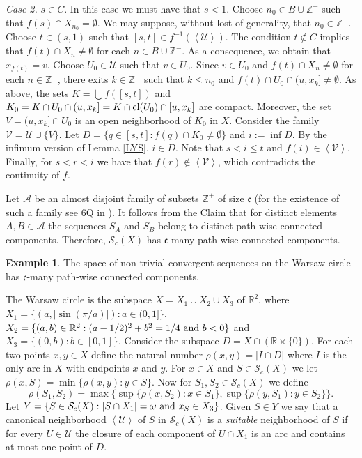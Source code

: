 \documentclass[11pt]{amsart}
\numberwithin{equation}{section}
\theoremstyle{plain}
\theoremstyle{definition}
\theoremstyle{definition}
\theoremstyle{definition}
\theoremstyle{definition}
\newtheorem{example}[equation]{Example}
\theoremstyle{definition}
\begin{document}
\textit{Case 2.} $s \in C$. In this case we must have that $s < 1$. Choose $n_0 \in B \cup {\mathbb{Z}^-}$ such that $f(s) \cap X_{n_0} = \emptyset$.  We may suppose, without lost of generality, that $n_0 \in {\mathbb{Z}^-}$. Choose $t \in (s,1)$ such that $[s,t] \in f^{-1}(\left\langle \mathcal{U}\right\rangle)$. The condition $t \not\in C$ implies that $f(t) \cap X_n \not= \emptyset$ for each $n \in B \cup {\mathbb{Z}^-}$. As a consequence, we obtain that $x_{f(t)} = v$. Choose $U_0 \in \mathcal{U}$ such that $v \in U_0$. Since $v \in U_0$ and $f(t) \cap X_n \not= \emptyset$ for each $n \in {\mathbb{Z}^-}$,  there exits $k \in {\mathbb{Z}^-}$ such that $k \leq n_0$ and $f(t) \cap U_0 \cap (u,x_k] \not= \emptyset$. As above,  the sets $K = \bigcup f([s,t])$ and $K_0 = K \cap U_0 \cap (u,x_k] = K \cap \textnormal{cl}(U_0) \cap [u,x_k]$ are compact. Moreover, the set $V = (u,x_k] \cap U_0$ is an open neighborhood of $K_0$ in $X$. Consider the family $\mathcal{V} = \mathcal{U} \cup \{V\}$. Let $D = \{q \in [s,t] : f(q) \cap K_0 \not= \emptyset\}$ and $i := \inf D$. By the infimum version of Lemma \ref{LYS}, $i \in D$. Note that $s < i \leq t$ and $f(i) \in \left\langle \mathcal{V} \right\rangle$. Finally, for $s < r < i$ we have that $f(r) \not \in \left\langle \mathcal{V} \right\rangle$, which contradicts the continuity of $f$.\medskip

Let $\mathcal{A}$ be an almost disjoint family of subsets ${\mathbb{Z}^+}$ of size $\mathfrak{c}$ (for the existence of such a family see 6Q in \cite{gaj}). It follows from the Claim that for  distinct elements $A,B \in \mathcal{A}$ the sequences $S_A$ and $S_B$ belong to distinct path-wise connected components. Therefore,   $\mathcal{S}_c(X)$ has $\mathfrak{c}$-many path-wise connected components.
\endproof

\begin{example}
The space of non-trivial convergent sequences on the Warsaw circle has $\mathfrak{c}$-many path-wise connected components.
\end{example}

\proof
The Warsaw circle is the subspace $X = X_1 \cup X_2 \cup X_3$ of ${\mathbb R}^2$, where $X_1 = \{(a,\left|\sin(\pi/a)\right|) : a \in (0,1]\}$, $X_2 = \{(a,b) \in {\mathbb R}^2 : (a-1/2)^2 + b^2 = 1/4 \textnormal{ and } b < 0\}$ and $X_3 = \{(0,b) : b \in [0,1]\}$. Consider the subspace $D = X \cap ({\mathbb R} \times \{0\})$. For each two points $x,y \in X$ define the natural number $\rho(x,y) = \left|I \cap D\right|$ where $I$ is the only arc in $X$ with endpoints $x$ and $y$. For $x \in X$ and $S \in \mathcal{S}_c(X)$ we let $\rho(x,S) = \min\{\rho(x,y) : y \in S\}$. Now for $S_1,S_2 \in \mathcal{S}_c(X)$ we define
$$
\rho(S_1,S_2) = \max\{\sup\{\rho(x,S_2) : x \in S_1\},\sup\{\rho(y,S_1) : y \in S_2\}\}.
$$
 Let $Y  = \{S \in \mathcal{S}_c(X) : \left|S \cap X_1\right| = \omega \textnormal{ and } x_S \in X_3\}$. Given $S \in Y$ we say that a canonical neighborhood $\left\langle \mathcal{U}\right\rangle$ of $S$ in $\mathcal{S}_c(X)$ is a \textit{suitable} neighborhood of $S$ if for every $U \in \mathcal{U}$ the closure of each component of $U \cap X_1$ is an arc and contains at most one point of $D$.
\medskip
\end{document}
